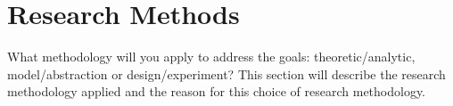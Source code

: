 \section{Research Methods}

What methodology will you apply to address the goals: theoretic/analytic, model/abstraction
or design/experiment? This section will describe the research methodology applied
and the reason for this choice of research methodology.